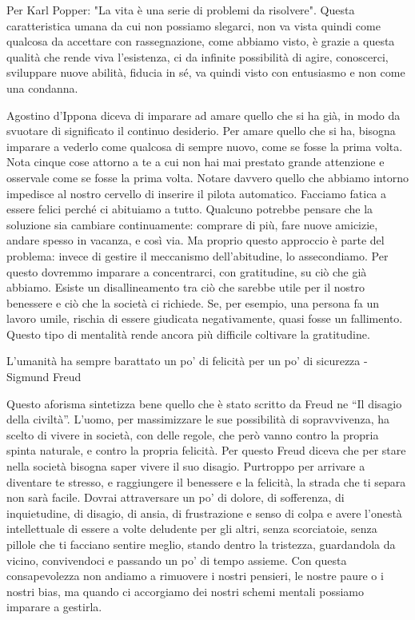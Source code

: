 \documentclass[12pt]{book} %
\begin{document}
Per Karl Popper: "La vita è una serie di problemi da risolvere". Questa
caratteristica umana da cui non possiamo slegarci, non va vista quindi come qualcosa da accettare con rassegnazione,
come abbiamo visto, è grazie a questa qualità che rende viva l'esistenza, ci da infinite
possibilità di agire, conoscerci, sviluppare nuove abilità, fiducia in sé, va quindi visto con entusiasmo e non come
una condanna.

Agostino d'Ippona diceva di imparare ad amare quello che si ha già, in modo da svuotare di significato il continuo
desiderio. Per amare quello che si ha, bisogna imparare a vederlo come qualcosa di sempre nuovo, come se fosse la prima
volta. Nota cinque cose attorno a te a cui non hai mai prestato grande attenzione e osservale come se fosse la prima
volta. Notare davvero quello che abbiamo intorno impedisce al nostro cervello di inserire il pilota automatico.
Facciamo fatica a essere felici perché ci abituiamo a tutto. Qualcuno potrebbe pensare che la soluzione sia cambiare continuamente: comprare di più, fare nuove amicizie, andare spesso in vacanza, e così via. Ma proprio questo approccio è parte del problema: invece di gestire il meccanismo dell'abitudine, lo assecondiamo. Per questo dovremmo imparare a concentrarci, con gratitudine, su ciò che già abbiamo.
Esiste un disallineamento tra ciò che sarebbe utile per il nostro benessere e ciò che la società ci richiede. Se, per esempio, una persona fa un lavoro umile, rischia di essere giudicata negativamente, quasi fosse un fallimento. Questo tipo di mentalità rende ancora più difficile coltivare la gratitudine.

L'umanità ha sempre barattato un po' di felicità per un po' di sicurezza - Sigmund Freud

Questo aforisma sintetizza bene quello che è stato scritto da Freud ne “Il disagio della civiltà”.
L'uomo, per massimizzare le sue possibilità di sopravvivenza, ha scelto di vivere in società, con
delle regole, che però vanno contro la propria spinta naturale, e contro la propria
felicità. Per questo Freud diceva che per stare nella società bisogna saper vivere il suo disagio. Purtroppo per
arrivare a diventare te stresso, e raggiungere il benessere e la felicità, la strada che ti separa non sarà facile. 
Dovrai attraversare un po' di dolore, di sofferenza, di inquietudine, di disagio, di ansia, di frustrazione e senso di
colpa e avere l'onestà intellettuale di essere a volte deludente per gli altri, senza scorciatoie,
senza pillole che ti facciano sentire meglio, stando dentro la tristezza, guardandola da vicino, convivendoci e
passando un po' di tempo assieme. Con questa consapevolezza non andiamo a rimuovere i nostri pensieri, le
nostre paure o i nostri bias, ma quando ci accorgiamo dei nostri schemi mentali possiamo imparare a gestirla.
\end{document}
